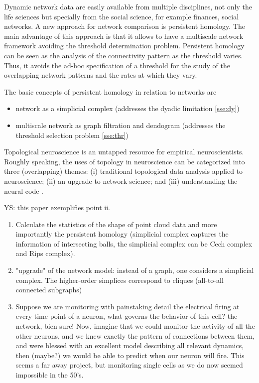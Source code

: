 \documentclass[onecollarge,runningheads]{svjour2}
\begin{document}
Dynamic network data are easily available from multiple disciplines, not only the life sciences but specially from the social science, for example finances, social networks. A new approach for network comparison is persistent homology. The main advantage of this approach is that it allows to have a multiscale network framework avoiding the threshold determination problem. Persistent homology can be seen as the analysis of the connectivity pattern as the threshold varies. Thus, it avoids the ad-hoc specification of a threshold for the study of the overlapping network patterns and the rates at which they vary.


The basic concepts of persistent homology in relation to networks are
\begin{itemize}
\item network as a simplicial complex (addresses the dyadic limitation \ref{sse:dy})
\item multiscale network as graph filtration and dendogram (addresses the threshold selection problem \ref{sse:thr})
\end{itemize}

Topological neuroscience is an untapped resource for empirical neuroscientists.
Roughly speaking, the uses of topology in neuroscience can be categorized into three (overlapping) themes: (i) traditional topological data analysis applied to neuroscience; (ii) an upgrade to network science; and (iii) understanding the neural code \cite{curto2016can}.

YS: this paper exemplifies point ii.

\begin{enumerate}
\item  Calculate the statistics of the shape of point cloud data and more importantly the persistent homology (simplicial complex captures the information of intersecting balls, the simplicial complex can be Cech complex and Rips complex).
\item  "upgrade" of the network model: instead of a graph, one considers a simplicial complex. The higher-order simplices correspond to cliques (all-to-all connected subgraphs)
\item Suppose we are monitoring with painstaking detail the electrical firing at every time point of a neuron, what governs the behavior of this cell? the network, bien sure!  Now, imagine that we could monitor the activity of all the other neurons, and we knew exactly the pattern of connections between them, and were blessed with an excellent model describing all relevant dynamics, then (maybe?) we would be able to predict when our neuron will fire. This seems a far away project, but monitoring  single cells as we do now seemed impossible in the 50's. %
\end{enumerate}



\begin{acknowledgements}

\end{acknowledgements}


\end{document}
